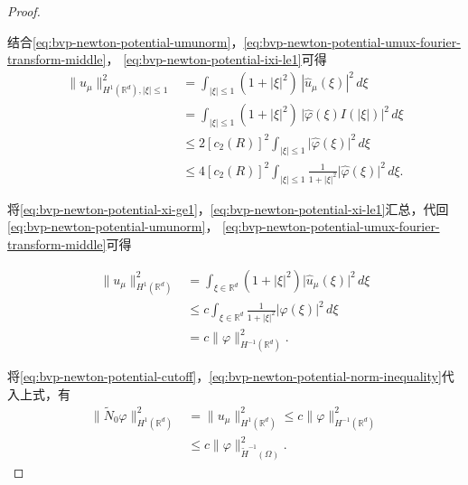 \begin{proof}
\begin{enumerate}
结合\eqref{eq:bvp-newton-potential-umunorm}，\eqref{eq:bvp-newton-potential-umux-fourier-transform-middle}，  \eqref{eq:bvp-newton-potential-ixi-le1}可得
\begin{equation}
  \label{eq:bvp-newton-potential-xi-le1}
  \begin{split}
    \big\| u_{\mu} \big\|_{H^{1}(\mathbb{R}^d), |\xi| \le 1}^2 &= \int_{|\xi| \le 1}
    \left( 1+ |\xi|^2 \right) \, |\widehat{u}_{\mu} (\xi) |^2 \, d \xi \\
    & =
    \int_{|\xi| \le 1} \left(1+ |\xi|^2 \right) \, \big|\widehat{\varphi}(\xi) I(|\xi|) \big|^2 \, d \xi \\
    & \le 2 \left[ c_{2}(R) \right]^2
    \int_{|\xi| \le 1} \big| \widehat{\varphi}(\xi) \big|^2 \, d \xi \\
    & \le 4 \left[ c_{2}(R) \right]^2
    \int_{|\xi| \le 1}
    \frac{1}{1+ | \xi |^2}
    \big| \widehat{\varphi}(\xi) \big|^2 \, d \xi.
  \end{split}
\end{equation}
\end{enumerate}

将\eqref{eq:bvp-newton-potential-xi-ge1}，\eqref{eq:bvp-newton-potential-xi-le1}汇总，代回\eqref{eq:bvp-newton-potential-umunorm}， \eqref{eq:bvp-newton-potential-umux-fourier-transform-middle}可得

\begin{equation}
  \label{eq:bvp-newton-potential-xi-sum}
  \begin{split}
    \big\| u _{\mu} \big\|_{H^{1}(\mathbb{R}^d)}^{2} &=
    \int_{\xi \in \mathbb{R}^d}
    \left( 1 + |\xi|^2 \right)
    \big| \widehat{u}_{\mu} (\xi) \big|^2
    \, d \xi \\
    & \le c \int_{\xi \in \mathbb{R}^d}
    \frac{1}{1 + | \xi |^2}
    \big| \widehat{\varphi}(\xi) \big|^2 \, d \xi \\
    & = c \big\| \varphi \big\|_{H^{-1}(\mathbb{R}^d)}^2.
  \end{split}
\end{equation}

将\eqref{eq:bvp-newton-potential-cutoff}，\eqref{eq:bvp-newton-potential-norm-inequality}代入上式，有
\begin{equation}
  \label{eq:bvp-newton-potential-n0varphi-cvarphi-ineq}
  \begin{split}
    \big\| \widetilde{N}_{0} \varphi \big\|_{H^{1}(\mathbb{R}^d)}^{2} &=
    \big\| u _{\mu} \big\|_{H^{1}(\mathbb{R}^d)}^{2}
    \le c \big\| \varphi \big\|_{H^{-1}(\mathbb{R}^d)}^2 \\
    & \le c \big\| \varphi \big\|_{\widetilde{H}^{-1}(\Omega)}^2.
  \end{split}
\end{equation}


\end{proof}
